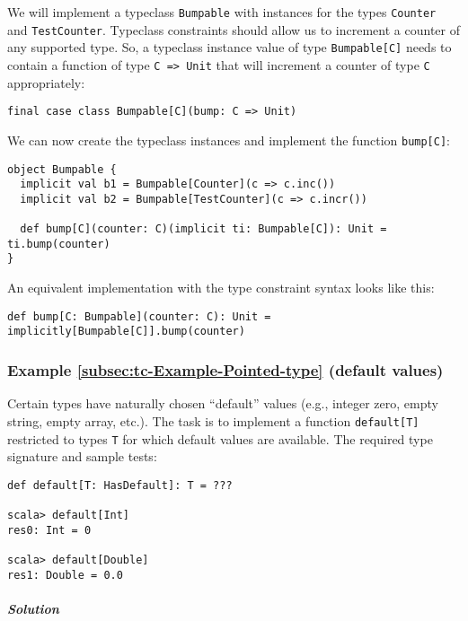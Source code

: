 We will implement a typeclass \lstinline!Bumpable! with instances
for the types \lstinline!Counter! and \lstinline!TestCounter!. Typeclass
constraints should allow us to increment a counter of any supported
type. So, a typeclass instance value of type \lstinline!Bumpable[C]!
needs to contain a function of type \lstinline!C => Unit! that will
increment a counter of type \lstinline!C! appropriately:
\begin{lstlisting}
final case class Bumpable[C](bump: C => Unit)
\end{lstlisting}
We can now create the typeclass instances and implement the function
\lstinline!bump[C]!:
\begin{lstlisting}
object Bumpable {
  implicit val b1 = Bumpable[Counter](c => c.inc())
  implicit val b2 = Bumpable[TestCounter](c => c.incr())
  
  def bump[C](counter: C)(implicit ti: Bumpable[C]): Unit = ti.bump(counter)
}
\end{lstlisting}
An equivalent implementation with the type constraint syntax looks
like this:
\begin{lstlisting}
def bump[C: Bumpable](counter: C): Unit = implicitly[Bumpable[C]].bump(counter)
\end{lstlisting}


\subsubsection{Example \label{subsec:tc-Example-Pointed-type}\ref{subsec:tc-Example-Pointed-type}
(default values)}

Certain types have naturally chosen \textsf{``}default\textsf{''} values (e.g., integer
zero, empty string, empty array, etc.). The task is to implement a
function \lstinline!default[T]! restricted to types \lstinline!T!
for which default values are available. The required type signature
and sample tests:
\begin{lstlisting}
def default[T: HasDefault]: T = ???

scala> default[Int]
res0: Int = 0

scala> default[Double]
res1: Double = 0.0
\end{lstlisting}


\subparagraph{Solution}


